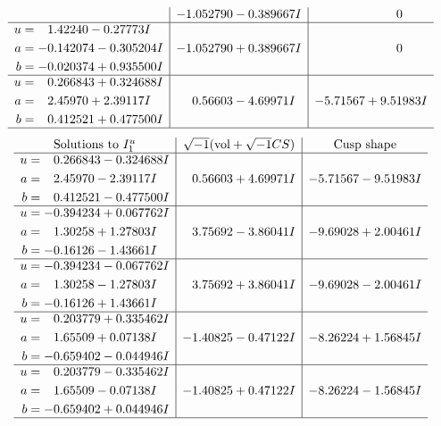 \documentclass[1p]{elsarticle_modified}
\theoremstyle{definition}
\newcommand{\I}{\sqrt{-1}}
\begin{document}
$$\begin{array}{c|c|c}
 & -1.052790 - 0.389667 I & \phantom{-0.000000 } 0 \\ \hline\begin{aligned}
u &= \phantom{-}1.42240 - 0.27773 I \\
a &= -0.142074 - 0.305204 I \\
b &= -0.020374 + 0.935500 I\end{aligned}
 & -1.052790 + 0.389667 I & \phantom{-0.000000 } 0 \\ \hline\begin{aligned}
u &= \phantom{-}0.266843 + 0.324688 I \\
a &= \phantom{-}2.45970 + 2.39117 I \\
b &= \phantom{-}0.412521 + 0.477500 I\end{aligned}
 & \phantom{-}0.56603 - 4.69971 I & -5.71567 + 9.51983 I\\
 \hline 
 \end{array}$$\newpage$$\begin{array}{c|c|c}  
\text{Solutions to }I^u_{1}& \I (\text{vol} + \sqrt{-1}CS) & \text{Cusp shape}\\
 \hline 
\begin{aligned}
u &= \phantom{-}0.266843 - 0.324688 I \\
a &= \phantom{-}2.45970 - 2.39117 I \\
b &= \phantom{-}0.412521 - 0.477500 I\end{aligned}
 & \phantom{-}0.56603 + 4.69971 I & -5.71567 - 9.51983 I \\ \hline\begin{aligned}
u &= -0.394234 + 0.067762 I \\
a &= \phantom{-}1.30258 + 1.27803 I \\
b &= -0.16126 - 1.43661 I\end{aligned}
 & \phantom{-}3.75692 - 3.86041 I & -9.69028 + 2.00461 I \\ \hline\begin{aligned}
u &= -0.394234 - 0.067762 I \\
a &= \phantom{-}1.30258 - 1.27803 I \\
b &= -0.16126 + 1.43661 I\end{aligned}
 & \phantom{-}3.75692 + 3.86041 I & -9.69028 - 2.00461 I \\ \hline\begin{aligned}
u &= \phantom{-}0.203779 + 0.335462 I \\
a &= \phantom{-}1.65509 + 0.07138 I \\
b &= -0.659402 - 0.044946 I\end{aligned}
 & -1.40825 - 0.47122 I & -8.26224 + 1.56845 I \\ \hline\begin{aligned}
u &= \phantom{-}0.203779 - 0.335462 I \\
a &= \phantom{-}1.65509 - 0.07138 I \\
b &= -0.659402 + 0.044946 I\end{aligned}
 & -1.40825 + 0.47122 I & -8.26224 - 1.56845 I\\
 \hline 
 \end{array}$$\newpage\newpage\renewcommand{\arraystretch}{1}
\end{document}
